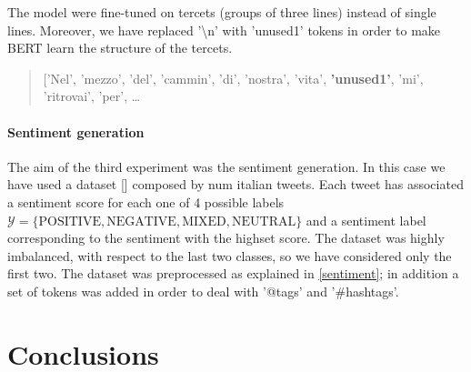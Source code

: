 \documentclass[10pt,twocolumn,letterpaper]{article}
\begin{document}
The model were fine-tuned on tercets (groups of three lines) instead of single lines.
Moreover, we have replaced '\textbackslash n' with 'unused1' tokens in order to make BERT learn the structure of the tercets.

\begin{quote}
['Nel', 'mezzo', 'del', 'cammin', 'di', 'nostra', 'vita', \textbf{'unused1'},
 'mi',
 'ritrovai',
 'per', \ldots
\end{quote}

\paragraph{Sentiment generation} The aim of the third experiment was the sentiment generation.
In this case we have used a dataset [] composed by num italian tweets.
Each tweet has associated a sentiment score for each one of 4 possible labels
$\mathcal Y = \{\text{POSITIVE}, \text{NEGATIVE}, \text{MIXED}, \text{NEUTRAL}\}$ and a sentiment label corresponding
to the sentiment with the highset score. 
The dataset was highly imbalanced, with respect to the last two classes, so we have considered only the first two.
The dataset was preprocessed as explained in \ref{sentiment}; in addition a set of tokens was added in order to deal
with '@tags' and '#hashtags'.



\section{Conclusions}



\end{document}
